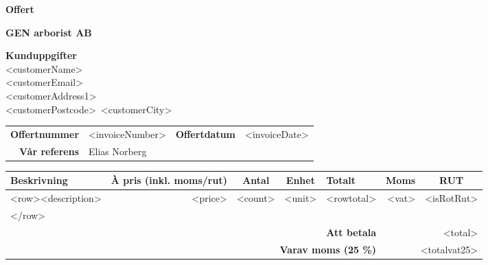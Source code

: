 \documentclass[a4paper,11pt]{extarticle}
\newcommand{\changefont}{%
        \fontsize{9}{11}\selectfont
    }
\begin{document}
\pagestyle{fancy}
\fancyhf{} %
\renewcommand{\headrulewidth}{0pt}
\renewcommand{\footrulewidth}{0pt}

\setlength{\fboxsep}{1.5em}
\setlength{\parindent}{0pt}

\begin{minipage}[b]{0.4\textwidth}
\raggedright
{\color{Primary}
\fontsize{36}{0}\selectfont
\textbf{Offert}}
\end{minipage}%
\begin{minipage}[b]{0.6\textwidth}
\raggedleft
{\color{Secondary}
\fontsize{36}{0}\selectfont
\textbf{GEN arborist AB}}
\end{minipage}

\vspace{2em}
\begin{minipage}[t]{0.3\textwidth}
\textbf{Kunduppgifter} \\
<customerName>\\
<customerEmail>\\
<customerAddress1>\\
<customerPostcode>~<customerCity>\\
\end{minipage}

\renewcommand\arraystretch{1.5}
\begin{tabular*}{\linewidth}{rlrl}
\hline
    \textbf{Offertnummer} & <invoiceNumber> & \textbf{Offertdatum} & <invoiceDate> \\
    \textbf{Vår referens} & Elias Norberg & &\\
\hline
\end{tabular*}

\begin{tabularx}{\textwidth}{Xrrrrrc}
\rowcolor{Gray}
\changefont \textbf{Beskrivning} &
\multicolumn{1}{l}{\changefont \textbf{À pris (inkl. moms/rut)}} &
\multicolumn{1}{c}{\changefont \textbf{Antal}} &
\multicolumn{1}{c}{\changefont \textbf{Enhet}} &
\multicolumn{1}{l}{\changefont \textbf{Totalt}} &
\multicolumn{1}{c}{\changefont \textbf{Moms}} &
\changefont \textbf{RUT}\\
\hline
    <row><description> & <price> & <count> & <unit> & <rowtotal> & <vat> & <isRotRut>\\
    </row>
    & & & & & & \\
\hline
    \multicolumn{5}{r}{\textbf{Att betala}} & \multicolumn{2}{r}{<total>} \\
    \multicolumn{5}{r}{\textbf{Varav moms (25 \%)}} & \multicolumn{2}{r}{<totalvat25>} \\
\hline
\end{tabularx}
\end{document}
